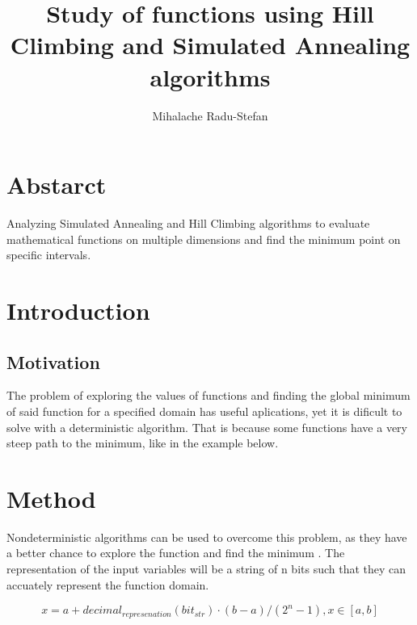 \documentclass{report}
\author{Mihalache Radu-Stefan}
\date{}
\title{Study of functions using Hill Climbing and Simulated Annealing algorithms}
\begin{document}
\maketitle

\section{Abstarct}
Analyzing Simulated Annealing and Hill Climbing algorithms to evaluate mathematical functions on multiple dimensions and find the minimum point on specific intervals.

\section{Introduction}
\subsection{Motivation}
The problem of exploring the values of functions and finding the global minimum of said function for a specified domain has useful aplications, yet it is dificult to solve with a deterministic algorithm.
That is because some functions have a very steep path to the minimum, like in the example below.

\begin{figure}[!h]
  \centering
{}
\end{figure}

\section{Method}

Nondeterministic algorithms can be used to overcome this problem, as they have a better chance to explore the function and find the minimum . 
\newline
The representation of the input variables will be a string of n bits such that they can accuately represent the function domain.

$$x = a + decimal_{represenation}(bit_{str}) \cdot (b - a)/(2^n - 1) ,  x \in \left[a, b \right]$$
\end{document}
